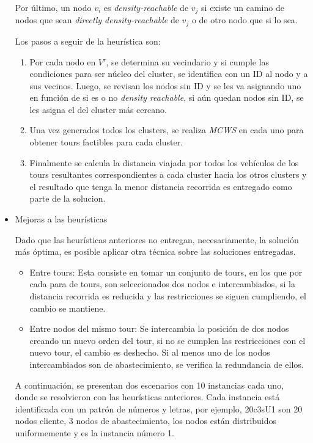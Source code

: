 \documentclass[letter, 10pt]{article}
\begin{document}
\begin{itemize}
Por último, un nodo \(v_i\) es \textit{density-reachable} de \(v_j\) si existe un camino de nodos que sean
\textit{directly density-reachable} de \(v_j\) o de otro nodo que si lo sea.

\bigskip
Los pasos a seguir de la heurística son:

\begin{enumerate}
\item Por cada nodo en \(V'\), se determina su vecindario y si cumple las condiciones para ser núcleo del
cluster, se identifica con un ID al nodo y a sus
vecinos. Luego, se revisan los nodos sin ID y se les va asignando uno en función de si es o no
\textit{density reachable}, si aún quedan nodos sin ID, se les asigna el del cluster más cercano.

\item Una vez generados todos los clusters, se realiza \textit{MCWS} en cada uno para obtener tours factibles
	para cada cluster. 

\item Finalmente se calcula la distancia viajada por todos los vehículos de los tours resultantes correspondientes
a cada cluster hacia los otros clusters y el resultado que tenga la menor distancia recorrida es entregado como
parte de la solucion.
\end{enumerate}

\item Mejoras a las heurísticas

Dado que las heurísticas anteriores no entregan, necesariamente, la solución más óptima, es posible aplicar
otra técnica sobre las soluciones entregadas.

\begin{itemize}
\item Entre tours: Esta consiste en tomar un conjunto de tours, en los que por cada
para de tours, son seleccionados dos nodos e intercambiados, si la distancia recorrida es reducida y las
restricciones se siguen cumpliendo, el cambio se mantiene.
\item Entre nodos del mismo tour: Se intercambia la posición de dos nodos creando un nuevo orden del tour, 
	si no se cumplen las restricciones con el nuevo tour, el cambio es deshecho. Si al menos uno de los nodos
	 intercambiados	son de abastecimiento, se verifica la redundancia de ellos.
\end{itemize} 

A continuación, se presentan dos escenarios con 10 instancias cada uno, donde se resolvieron con las heurísticas anteriores. Cada instancia está identificada con un patrón de números y letras, por ejemplo, 20c3sU1 son 20
nodos cliente, 3 nodos de abastecimiento, los nodos están distribuidos uniformemente y es la instancia número 1.


\end{itemize}
\end{document}
